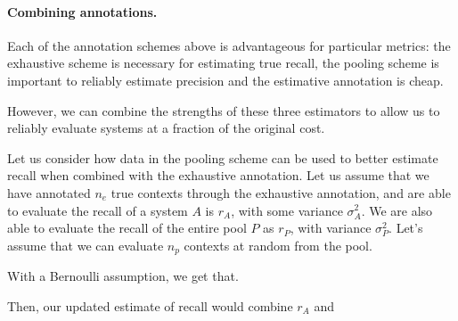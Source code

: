 \paragraph{Combining annotations.}

Each of the annotation schemes above is advantageous for particular metrics: the exhaustive scheme is necessary for estimating true recall, the pooling scheme is important to reliably estimate precision and the estimative annotation is cheap.

However, we can combine the strengths of these three estimators to allow us to reliably evaluate systems at a fraction of the original cost.

Let us consider how data in the pooling scheme can be used to better estimate recall when combined with the exhaustive annotation.
Let us assume that we have annotated $n_e$ true contexts through the exhaustive annotation, and are able to evaluate the recall of a system $A$ is $r_A$, with some variance $\sigma^2_A$.
We are also able to evaluate the recall of the entire pool $P$ as $r_P$, with variance $\sigma^2_P$.
Let's assume that we can evaluate $n_p$ contexts at random from the pool. 

With a Bernoulli assumption, we get that.

Then, our updated estimate of recall would combine $r_A$ and 
\onecolumn

